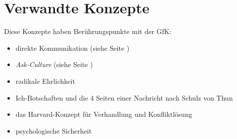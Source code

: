 \section{Verwandte Konzepte}
\label{verwandte-konzepte}

Diese Konzepte haben Berührungspunkte mit der GfK:

\begin{itemize}
  \item direkte Kommunikation (siehe Seite \pageref{direkte-kommunikation})
  \item \emph{Ask-Culture} (siehe Seite \pageref{ask-guess-culture})
  \item radikale Ehrlichkeit \cite{radical-honesty}
  \item Ich-Botschaften und die 4 Seiten einer Nachricht nach Schulz von Thun \cite{miteinander-reden-1}
  \item das Harvard-Konzept \cite{harvard-konzept} für Verhandlung und Konfliktlösung
  \item psychologische Sicherheit
\end{itemize}
